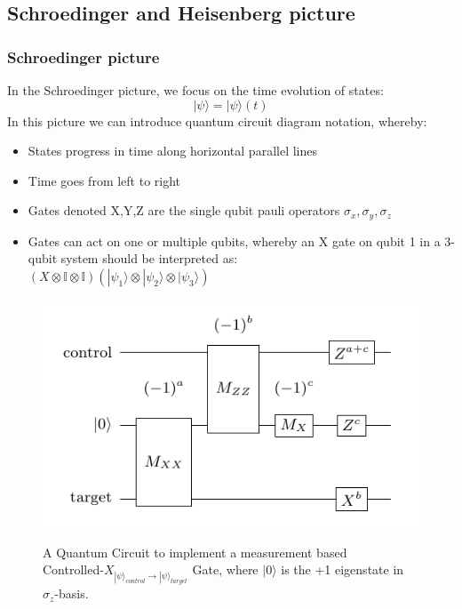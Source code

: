 \subsection{Schroedinger and Heisenberg picture}
\subsubsection{Schroedinger picture}
In the Schroedinger picture, we focus on the time evolution of states:
\begin{equation}  
	|\psi\rangle = |\psi\rangle(t) 
\end{equation}
In this picture we can introduce quantum circuit diagram notation, whereby:
\begin{itemize}
	\item States progress in time along horizontal parallel lines
	\item Time goes from left to right
	\item Gates denoted X,Y,Z are the single qubit pauli operators
		$\sigma_x,\sigma_y,\sigma_z$
	\item Gates can act on one or multiple qubits, whereby an X gate 
		on qubit 1 in a 3-qubit system should be interpreted as:
		\\$(X\otimes \mathbb{I} \otimes \mathbb{I}) (|\psi_1\rangle
		\otimes |\psi_2\rangle \otimes |\psi_3\rangle)$
\end{itemize}
\begin{figure}[h!]
	\begin{center}
\includegraphics[scale=0.5]{img/cnotMeasureCircuit.png}\\
	\caption{A Quantum Circuit to implement a measurement based\\
		Controlled-$X_{|\psi\rangle_{control}\rightarrow |\psi\rangle_{target}}$ Gate,
		where $|0\rangle$ is the +1 eigenstate in $\sigma_{z}$-basis.}
	\label{fig:circuit1}
	\end{center}
\end{figure}
\newpage

